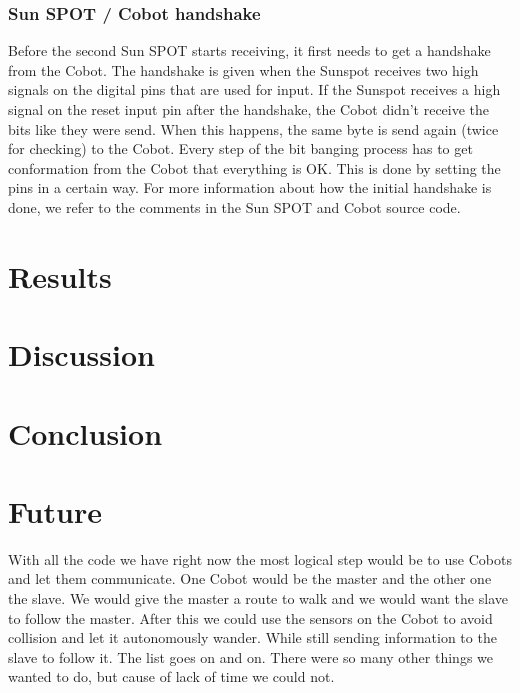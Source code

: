 \documentclass[a4paper,10pt]{article} %
\begin{document}

\subsubsection{Sun SPOT / Cobot handshake} %
\label{subsub:Sun SPOT / Cobot handshake}

Before the second Sun SPOT starts receiving, it first needs to get a handshake
from the Cobot. The handshake is given when the Sunspot receives two high
signals on the digital pins that are used for input. If the Sunspot receives a
high signal on the reset input pin after the handshake, the Cobot didn't receive
the bits like they were send. When this happens, the same byte is send again
(twice for checking) to the Cobot. Every step of the bit banging process has to
get conformation from the Cobot that everything is OK. This is done by setting
the pins in a certain way. For more information about how the initial handshake
is done, we refer to the comments in the Sun SPOT and Cobot source code.




\section{Results} %
\label{sec:Results}

\section{Discussion} %


\section{Conclusion} %


\section{Future} %
\label{sec:future}

With all the code we have right now the most logical step would be to use Cobots
and let them communicate. One Cobot would be the master and the other one the
slave. We would give the master a route to walk and we would want the slave to
follow the master. After this we could use the sensors on the Cobot to avoid
collision and let it autonomously wander. While still sending information to the
slave to follow it. The list goes on and on. There were so many other things we
wanted to do, but cause of lack of time we could not.
\end{document}
